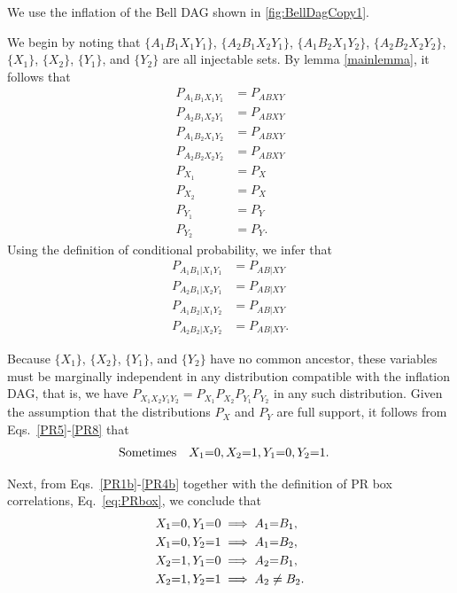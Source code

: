 We use the inflation of the Bell DAG shown in \cref{fig:BellDagCopy1}.

We begin by noting that $\{A_1 B_1 X_1 Y_1\}$, $\{A_2 B_1 X_2 Y_1\}$, $\{A_1 B_2 X_1 Y_2\}$, $\{A_2 B_2 X_2 Y_2\}$, $\{X_1\}$, $\{X_2\}$, $\{Y_1\}$, and $\{Y_2\}$ are all injectable sets. 
By lemma \ref{mainlemma}, it follows that 
\begin{align}
P_{A_1 B_1 X_1 Y_1}&=P_{A B X Y}\label{PR1}\\
P_{A_2 B_1 X_2 Y_1}&=P_{A B X Y}\label{PR2}\\
P_{A_1 B_2 X_1 Y_2}&=P_{A B X Y}\label{PR3}\\
P_{A_2 B_2 X_2 Y_2}&=P_{A B X Y}\label{PR4}\\
P_{X_1}&=P_X\label{PR5}\\
P_{X_2}&=P_X\label{PR6}\\
P_{Y_1}&=P_Y\label{PR7}\\
P_{Y_2}&=P_Y\label{PR8}.
\end{align}
Using the definition of conditional probability, we infer that
\begin{align}
P_{A_1 B_1 |X_1 Y_1}&=P_{A B |X Y}\label{PR1b}\\
P_{A_2 B_1 |X_2 Y_1}&=P_{A B |X Y}\label{PR2b}\\
P_{A_1 B_2 |X_1 Y_2}&=P_{A B |X Y}\label{PR3b}\\
P_{A_2 B_2 |X_2 Y_2}&=P_{A B |X Y}\label{PR4b}.
\end{align}


Because $\{X_1\}$, $\{X_2\}$, $\{Y_1\}$, and $\{Y_2\}$ have no common ancestor, these variables must be marginally independent in any distribution compatible with the inflation DAG,  that is, we have $P_{X_1 X_2 Y_1 Y_2} = P_{X_1} P_{X_2} P_{Y_1} P_{Y_2}$ in any such distribution.   Given the assumption that the distributions $P_{X}$ and $P_{Y}$ are full support, it follows from Eqs.~\eqref{PR5}-\eqref{PR8} that
\begin{align}\label{PRs}
\text{Sometimes} \quad &X_1 \mathord{=} 0, X_2 \mathord{=}1, Y_1 \mathord{=} 0, Y_2 \mathord{=} 1.
\end{align} 

Next, from Eqs.~\eqref{PR1b}-\eqref{PR4b} together with  the definition of PR box correlations, Eq.~\eqref{eq:PRbox}, we conclude that 
\begin{align} 
&X_1 \mathord{=} 0, Y_1 \mathord{=} 0 \implies A_1\mathord{=} B_1 \label{PRs1},\\
&X_1 \mathord{=} 0, Y_2 \mathord{=} 1 \implies A_1\mathord{=} B_2 \label{PRs2},\\
&X_2 \mathord{=} 1, Y_1 \mathord{=} 0 \implies A_2\mathord{=} B_1 \label{PRs3},\\
&X_2 \mathord{=} 1, Y_2 \mathord{=} 1 \implies A_2\ne B_2 \label{PRs4}.
\end{align}

